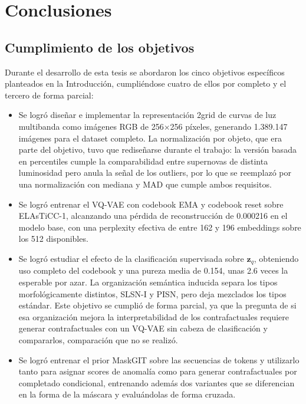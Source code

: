 \section{Conclusiones}

\subsection{Cumplimiento de los objetivos}

Durante el desarrollo de esta tesis se abordaron los cinco objetivos específicos planteados en la Introducción, cumpliéndose cuatro de ellos por completo y el tercero de forma parcial:

\begin{itemize}
    \item Se logró diseñar e implementar la representación 2grid de curvas de luz multibanda como imágenes RGB de 256×256 píxeles, generando 1.389.147 imágenes para el dataset completo. La normalización por objeto, que era parte del objetivo, tuvo que rediseñarse durante el trabajo: la versión basada en percentiles cumple la comparabilidad entre supernovas de distinta luminosidad pero anula la señal de los outliers, por lo que se reemplazó por una normalización con mediana y MAD que cumple ambos requisitos.

    \item Se logró entrenar el VQ-VAE con codebook EMA y codebook reset sobre ELAsTiCC-1, alcanzando una pérdida de reconstrucción de 0.000216 en el modelo base, con una perplexity efectiva de entre 162 y 196 embeddings sobre los 512 disponibles.

    \item Se logró estudiar el efecto de la clasificación supervisada sobre $\mathbf{z}_q$, obteniendo uso completo del codebook y una pureza media de 0.154, unas 2.6 veces la esperable por azar. La organización semántica inducida separa los tipos morfológicamente distintos, SLSN-I y PISN, pero deja mezclados los tipos estándar. Este objetivo se cumplió de forma parcial, ya que la pregunta de si esa organización mejora la interpretabilidad de los contrafactuales requiere generar contrafactuales con un VQ-VAE sin cabeza de clasificación y compararlos, comparación que no se realizó.

    \item Se logró entrenar el prior MaskGIT sobre las secuencias de tokens y utilizarlo tanto para asignar scores de anomalía como para generar contrafactuales por completado condicional, entrenando además dos variantes que se diferencian en la forma de la máscara y evaluándolas de forma cruzada.


\end{itemize}
